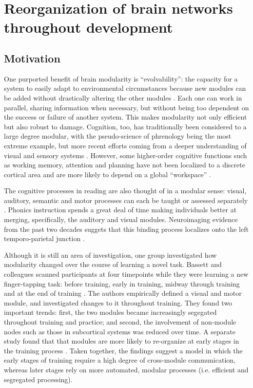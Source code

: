 \chapter{Reorganization of brain networks throughout development}

\section{Motivation}

One purported benefit of brain modularity is ``evolvability'': the capacity for a system to easily adapt to environmental circumstances because new modules can be added without drastically altering the other modules \citep{Kashton2005}. Each one can work in parallel, sharing information when necessary, but without being too dependent on the success or failure of another system. This makes modularity not only efficient but also robust to damage. Cognition, too, has traditionally been considered to a large degree modular, with the pseudo-science of phrenology being the most extreme example, but more recent efforts coming from a deeper understanding of visual and sensory systems \citep{Barrett2006}. However, some higher-order cognitive functions such as working memory, attention and planning have not been localized to a discrete cortical area and are more likely to depend on a global ``workspace'' \citep{Dahaene1998}.

The cognitive processes in reading are also thought of in a modular sense: visual, auditory, semantic and motor processes can each be taught or assessed separately \citep{Cutting2009a}. Phonics instruction spends a great deal of time making individuals better at merging, specifically, the auditory and visual modules. Neuroimaging evidence from the past two decades suggets that this binding process localizes onto the left temporo-parietal junction \citep{}. 

Although it is still an area of investigation, one group investigated how modularity changed over the course of learning a novel task. Bassett and colleagues scanned participants at four timepoints while they were learning a new finger-tapping task: before training, early in training, midway through training and at the end of training \citep{Bassett2015}. The authors empirically defined a visual and motor module, and investigated changes to it throughout training. They found two important trends: first, the two modules became increasingly segegated throughout training and practice; and second, the involvement of non-module nodes such as those in subcortical systems was reduced over time. A separate study found that that modules are more likely to re-organize at early stages in the training process \citep{Bassett2011}. Taken together, the findings suggest a model in which the early stages of training require a high degree of cross-module communication, whereas later stages rely on more automated, modular processes (i.e. efficient and segregated processing). 


